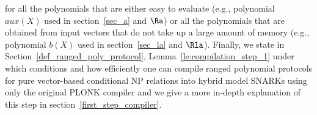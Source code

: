 for all the polynomials that are either easy to evaluate (e.g., polynomial $aux(X)$ used in section~\ref{sec_a} and $\Ra$) or 
all the polynomials that are obtained from input vectors that do not take up a large amount of memory (e.g., polynomial $b(X)$ used in section~\ref{sec_la} and $\Rla$).
Finally, we state in Section~\ref{def_ranged_poly_protocol}, Lemma~\ref{le:compilation_step_1} under which conditions and how efficiently 
one can compile ranged polynomial protocols for pure vector-based conditional NP relations 
into hybrid model SNARKs using only the original PLONK compiler and we give a more in-depth explanation of this step in section~\ref{first_step_compiler}.\\